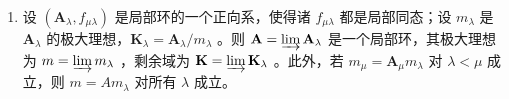 \begin{enumerate}
\def\labelenumi{\arabic{enumi}.}
\setcounter{enumi}{15}
\tightlist
\item
  设 \((\mathbf{A}_{\lambda}, f_{\mu \lambda})\) 是局部环的一个正向系，使得诸 \(f_{\mu \lambda}\) 都是局部同态；设 \(m_{\lambda}\) 是 \(\mathbf{A}_{\lambda}\) 的极大理想，\(\mathbf{K}_{\lambda} = \mathbf{A}_{\lambda} / m_{\lambda}\) 。则 \(\mathbf{A} = \varinjlim \mathbf{A}_{\lambda}\) 是一个局部环，其极大理想为 \(m = \varinjlim m_{\lambda}\) ，剩余域为 \(\mathbf{K} = \varinjlim \mathbf{K}_{\lambda}\) 。此外，若 \(m_{\mu} = \mathbf{A}_{\mu} m_{\lambda}\) 对 \(\lambda < \mu\) 成立，则 \(m = Am_{\lambda}\) 对所有 \(\lambda\) 成立。
\end{enumerate}

